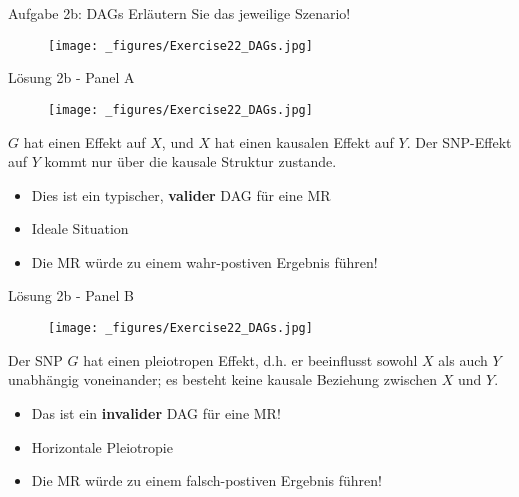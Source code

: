 \documentclass{beamer}
\begin{document}
\begin{frame}{Aufgabe 2b: DAGs}
Erläutern Sie das jeweilige Szenario!

\begin{figure}[h]
\begin{center}
\texttt{[image: \_figures/Exercise22\_DAGs.jpg]}
\label{fig:DAGs}
\end{center}
\end{figure}

\end{frame}

\begin{frame}{Lösung 2b - Panel A}
\begin{figure}[h]
\begin{center}
\texttt{[image: \_figures/Exercise22\_DAGs.jpg]}
\label{fig:DAGsA}
\end{center}
\end{figure}

$G$ hat einen Effekt auf $X$, und $X$ hat einen kausalen Effekt auf $Y$. Der SNP-Effekt auf $Y$ kommt nur über die kausale Struktur zustande. 

        \begin{itemize}
            \item Dies ist ein typischer, \textbf{valider} DAG für eine MR
            \item Ideale Situation
            \item Die MR würde zu einem wahr-postiven Ergebnis führen!
        \end{itemize}        
\end{frame}

\begin{frame}{Lösung 2b - Panel B}
\begin{figure}[h]
\begin{center}
\texttt{[image: \_figures/Exercise22\_DAGs.jpg]}
\label{fig:DAGsB}
\end{center}
\end{figure}

Der SNP $G$ hat einen pleiotropen Effekt, d.h. er beeinflusst sowohl $X$ als auch $Y$ unabhängig voneinander; es besteht keine kausale Beziehung zwischen $X$ und $Y$. 

        \begin{itemize}
            \item Das ist ein \textbf{invalider} DAG für eine MR! 
            \item Horizontale Pleiotropie
            \item Die MR würde zu einem falsch-postiven Ergebnis führen!
        \end{itemize} 
\end{frame}
\end{document}

